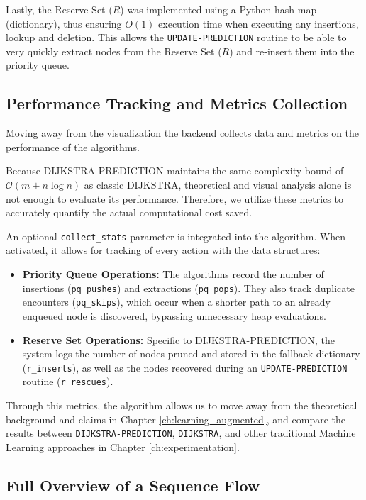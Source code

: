 Lastly, the Reserve Set ($R$) was implemented using a Python hash map (dictionary), thus ensuring $O(1)$ execution time when executing any insertions, lookup and deletion. This allows the \texttt{UPDATE-PREDICTION} routine to be able to very quickly extract nodes from the Reserve Set ($R$) and re-insert them into the priority queue.

\subsection{Performance Tracking and Metrics Collection}
\label{subsec:performace_tracking}

Moving away from the visualization the backend collects data and metrics on the performance of the algorithms.

Because \textsc{DIJKSTRA-PREDICTION} maintains the  same complexity bound of $\mathcal{O}(m+n\log n)$ as classic \textsc{DIJKSTRA}, theoretical and visual analysis alone is not enough to evaluate its performance. Therefore, we utilize these metrics to accurately quantify the actual computational cost saved.

An optional \texttt{collect\_stats} parameter is integrated into the algorithm. When activated, it allows for tracking of every action with the data structures:


\begin{itemize}
    \item \textbf{Priority Queue Operations:} The algorithms record the number of insertions (\texttt{pq\_pushes}) and extractions (\texttt{pq\_pops}). They also track duplicate encounters (\texttt{pq\_skips}), which occur when a shorter path to an already enqueued node is discovered, bypassing unnecessary heap evaluations.
    \item \textbf{Reserve Set Operations:} Specific to \textsc{DIJKSTRA-PREDICTION}, the system logs the number of nodes pruned and stored in the fallback dictionary (\texttt{r\_inserts}), as well as the nodes recovered during an \texttt{UPDATE-PREDICTION} routine (\texttt{r\_rescues}).
\end{itemize}

Through this metrics, the algorithm allows us to move away from the theoretical background and claims in Chapter \ref{ch:learning_augmented}, and compare the results between \texttt{DIJKSTRA-PREDICTION}, \texttt{DIJKSTRA}, and other traditional Machine Learning approaches in Chapter \ref{ch:experimentation}.

\subsection{Full Overview of a Sequence Flow}
\label{subsec:sequence_flow}

